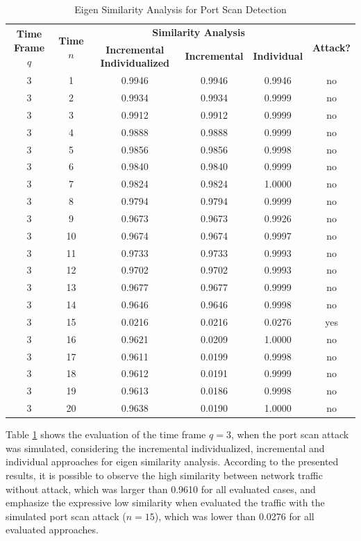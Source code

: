 \documentclass[review]{elsarticle}
\begin{document}
\begin{table}[h!]
  \centering
  \footnotesize
  \caption{Eigen Similarity Analysis for Port Scan Detection}
  \label{tab:tab5}
  \begin{tabular}{ c c c c c c }
	\toprule
	\multirow{2}{*}{\textbf{Time Frame} $q$} &\multirow{2}{*}{\textbf{Time} $n$}   &\multicolumn{3}{c}{\textbf{Similarity Analysis}} &\multirow{2}{*}{\textbf{Attack?}}\\ 
			\hhline{~~---~}
			& &\textbf{Incremental Individualized} &\textbf{Incremental} &\textbf{Individual}\\
	\midrule
	3 &1 &0.9946 &0.9946 &0.9946 &no \\
	3 &2 &0.9934 &0.9934 &0.9999 &no \\
	3 &3 &0.9912 &0.9912 &0.9999 &no \\
	3 &4 &0.9888 &0.9888 &0.9999 &no \\
	3 &5 &0.9856 &0.9856 &0.9998 &no \\
	3 &6 &0.9840 &0.9840 &0.9999 &no \\
	3 &7 &0.9824 &0.9824 &1.0000 &no \\
	3 &8 &0.9794 &0.9794 &0.9999 &no \\
	3 &9 &0.9673 &0.9673 &0.9926 &no \\
	3 &10 &0.9674 &0.9674 &0.9997 &no \\
	3 &11 &0.9733 &0.9733 &0.9993 &no \\
	3 &12 &0.9702 &0.9702 &0.9993 &no \\
	3 &13 &0.9677 &0.9677 &0.9999 &no \\
	3 &14 &0.9646 &0.9646 &0.9998 &no \\
	3 &15 &0.0216 &0.0216 &0.0276 &yes \\
	3 &16 &0.9621 &0.0209 &1.0000 &no \\
	3 &17 &0.9611 &0.0199 &0.9998 &no \\
	3 &18 &0.9612 &0.0191 &0.9999 &no \\
	3 &19 &0.9613 &0.0186 &0.9998 &no \\
	3 &20 &0.9638 &0.0190 &1.0000 &no \\
    \bottomrule
  \end{tabular}
\end{table}

Table \ref{tab:tab5} shows the evaluation of the time frame $q=3$, when the port scan attack was simulated, considering the incremental individualized, incremental and individual approaches for eigen similarity analysis. According to the presented results, it is possible to observe the high similarity between network traffic without attack, which was larger than 0.9610 for all evaluated cases, and emphasize the expressive low similarity when evaluated the traffic with the simulated port scan attack ($n=15$), which was lower than 0.0276 for all evaluated approaches.
\end{document}
